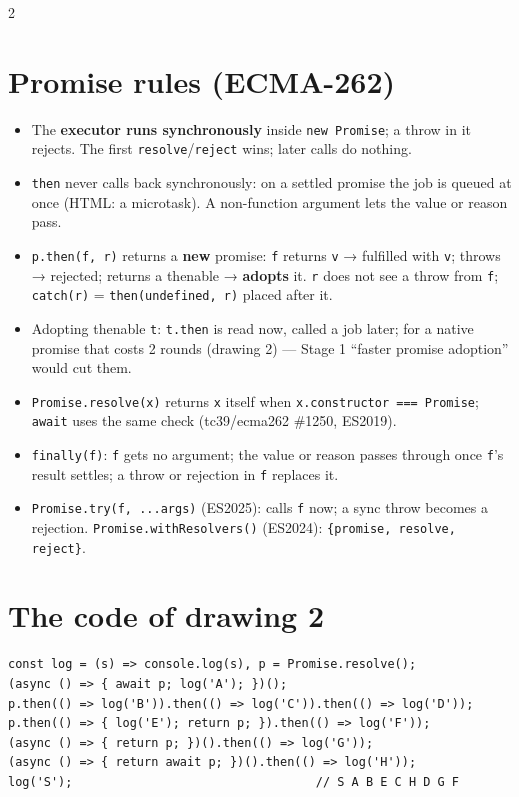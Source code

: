 \documentclass[8pt]{extarticle}
\newcommand\ct[1]{\texttt{#1}}
\begin{document}
\begin{multicols}{2}
\raggedright
\footnotesize{}

\section{Promise rules (ECMA-262)}
\begin{itemize}
  \item The \textbf{executor runs synchronously} inside \ct{new Promise}; a throw in it rejects.
        The first \ct{resolve}/\ct{reject} wins; later calls do nothing.
  \item \ct{then} never calls back synchronously: on a settled promise the job is queued at
        once (HTML: a microtask). A non-function argument lets the value or reason pass.
  \item \ct{p.then(f, r)} returns a \textbf{new} promise: \ct{f} returns \ct{v} → fulfilled with
        \ct{v}; throws → rejected; returns a thenable → \textbf{adopts} it. \ct{r} does not see a
        throw from \ct{f}; \ct{catch(r)} = \ct{then(undefined, r)} placed after it.
  \item Adopting thenable \ct{t}: \ct{t.then} is read now, called a job later; for a native
        promise that costs 2 rounds (drawing 2) — Stage 1 ``faster promise adoption'' would cut them.
  \item \ct{Promise.resolve(x)} returns \ct{x} itself when \ct{x.constructor === Promise};
        \ct{await} uses the same check (tc39/ecma262 \#1250, ES2019).
  \item \ct{finally(f)}: \ct{f} gets no argument; the value or reason passes through once
        \ct{f}'s result settles; a throw or rejection in \ct{f} replaces it.
  \item \ct{Promise.try(f, ...args)} (ES2025): calls \ct{f} now; a sync throw becomes a
        rejection. \ct{Promise.withResolvers()} (ES2024): \ct{\{promise, resolve, reject\}}.
\end{itemize}

\section{The code of drawing 2}
\begin{lstlisting}[style=js]
const log = (s) => console.log(s), p = Promise.resolve();
(async () => { await p; log('A'); })();
p.then(() => log('B')).then(() => log('C')).then(() => log('D'));
p.then(() => { log('E'); return p; }).then(() => log('F'));
(async () => { return p; })().then(() => log('G'));
(async () => { return await p; })().then(() => log('H'));
log('S');                                  // S A B E C H D G F
\end{lstlisting}


\end{multicols}
\end{document}
